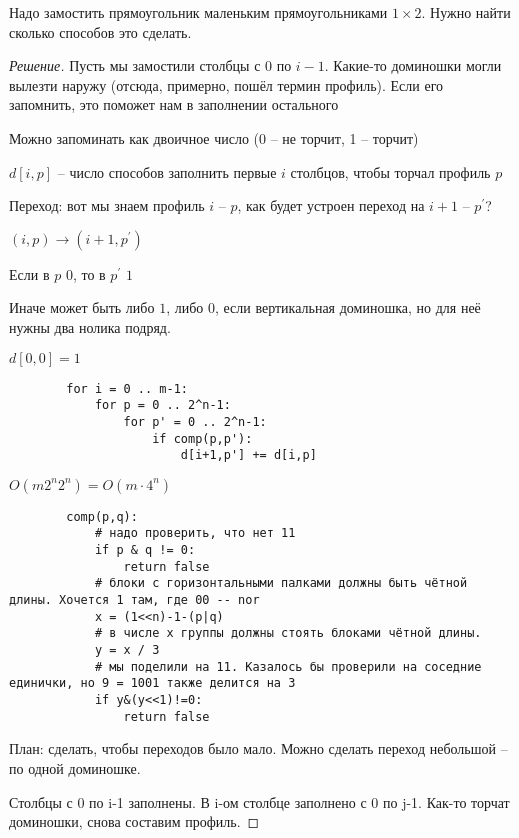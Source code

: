 \documentclass{book}
\newcommand{\p}[1]{#1^{\prime}}
\theoremstyle{definition}
\begin{document}
\begin{problem}
    Надо замостить прямоугольник маленьким прямоугольниками $1\times 2$. Нужно найти сколько способов это сделать. 
\end{problem}
\begin{proof}
    [Решение]

    Пусть мы замостили столбцы с $0$ по  $i-1$. Какие-то доминошки могли вылезти наружу (отсюда, примерно, пошёл термин профиль). Если его запомнить, это поможет нам в заполнении остального

    Можно запоминать как двоичное число (0 -- не торчит, 1 -- торчит) 

    $d[i,p]$ -- число способов заполнить первые  $i$ столбцов, чтобы торчал профиль  $p$

    Переход: вот мы знаем профиль $i$ -- $p$, как будет устроен переход на  $i+1$ -- $\p p$? 

    $(i,p)  \to  (i+1, \p p)$ 

    Если в $p$  $0$, то в  $\p p$  $1$

    Иначе может быть либо  $1$, либо  $0$, если вертикальная доминошка, но для неё нужны два нолика подряд.

    $d[0,0] = 1$

     \begin{verbatim}
        for i = 0 .. m-1:
            for p = 0 .. 2^n-1:
                for p' = 0 .. 2^n-1:
                    if comp(p,p'):
                        d[i+1,p'] += d[i,p]
    \end{verbatim}  
    $O(m2^n2^n) = O(m\cdot 4^n)$

    \begin{verbatim}
        comp(p,q):
            # надо проверить, что нет 11
            if p & q != 0:
                return false
            # блоки с горизонтальными палками должны быть чётной длины. Хочется 1 там, где 00 -- nor
            x = (1<<n)-1-(p|q)
            # в числе х группы должны стоять блоками чётной длины.
            y = x / 3
            # мы поделили на 11. Казалось бы проверили на соседние единички, но 9 = 1001 также делится на 3
            if y&(y<<1)!=0:
                return false
    \end{verbatim}

    План: сделать, чтобы переходов было мало. Можно сделать переход небольшой -- по одной доминошке.

    Столбцы с 0 по i-1 заполнены. В i-ом столбце заполнено с 0 по j-1. Как-то торчат доминошки, снова составим профиль.


\end{proof}
\end{document}
